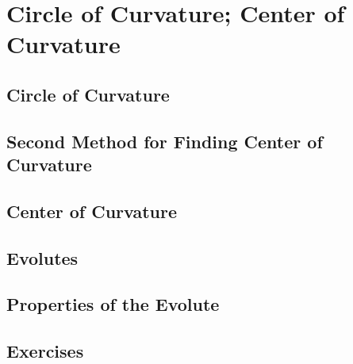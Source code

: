 \chapter{Circle of Curvature; Center of Curvature}
\label{ch:14}

\section{Circle of Curvature}
\label{sec:14:01}

\section{Second Method for Finding Center of Curvature}
\label{sec:14:02}

\section{Center of Curvature}
\label{sec:14:03}

\section{Evolutes}
\label{sec:14:04}

\section{Properties of the Evolute}
\label{sec:14:05}

\section{Exercises}
\label{sec:14:06}
